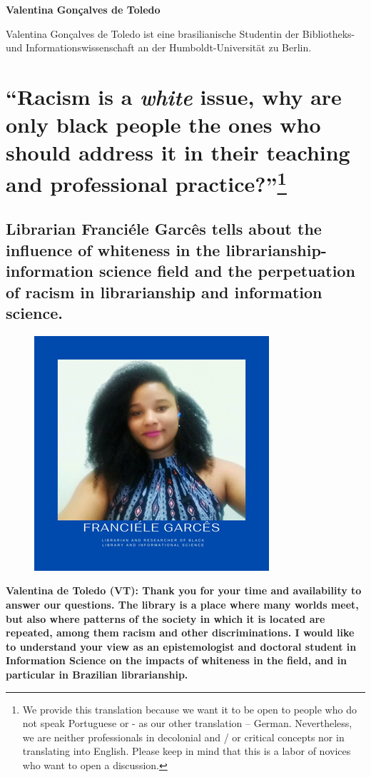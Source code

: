 \documentclass[a4paper,
fontsize=11pt,
oneside,
numbers=noperiodatend,
parskip=half-,
bibliography=totoc,
final
]{scrartcl}
\begin{document}
\textbf{Valentina Gonçalves de Toledo}

Valentina Gonçalves de Toledo ist eine brasilianische Studentin der
Bibliotheks- und Informationswissenschaft an der Humboldt-Universität zu
Berlin.

\newpage

\section[\enquote{Racism is a \textit{white} issue, why are only black people the ones who should address it in their teaching and professional practice?}]{\enquote{Racism is a \textit{white} issue, why are only black people the ones who should address it in their teaching and professional practice?}\footnote{We provide this translation because we want it to be open to people who do not speak Portuguese or - as our other translation -- German. Nevertheless, we are neither professionals in decolonial and / or critical concepts nor in translating into English. Please keep in mind that this is a labor of novices who want to open a discussion.}}
\subsection*{Librarian Franciéle Garcês tells about the influence of whiteness in the librarianship-information science field and the perpetuation of racism in librarianship and information science.}

\begin{figure}[h!]
\centering
\includegraphics{img/img1.PNG}
\end{figure}

\textbf{Valentina de Toledo (VT): Thank you for your time and
availability to answer our questions. The library is a place where many
worlds meet, but also where patterns of the society in which it is
located are repeated, among them racism and other discriminations. I
would like to understand your view as an epistemologist and doctoral
student in Information Science on the impacts of whiteness in the field,
and in particular in Brazilian librarianship.}
\end{document}
